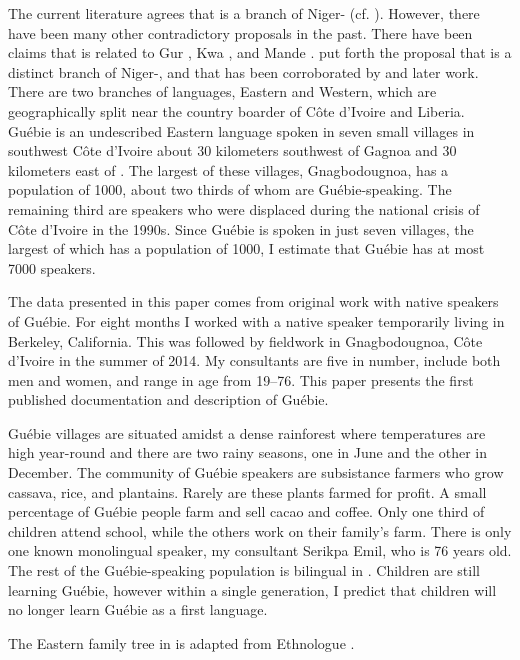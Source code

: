 \documentclass[output=paper,modfonts]{langscibook}
\begin{document}
The current literature agrees that  is a branch of Niger- (cf. \citealt{Marchese2012}). However, there have been many other contradictory proposals in the past. There have been claims that  is related to Gur \citep{Vogler1974}, Kwa \citep{Greenberg1963}, and Mande \citep{Bennett1977}. \cite{Welmers1977} put forth the proposal that  is a distinct branch of Niger-, and that has been corroborated by \cite{Marchese1979} and later work. There are two  branches of  languages, Eastern and Western, which are geographically split near the country boarder of Côte d'Ivoire and Liberia. Guébie is an undescribed Eastern  language spoken in seven small villages in southwest Côte d'Ivoire about 30 kilometers southwest of Gagnoa and 30 kilometers east of . The largest of these villages, Gnagbodougnoa, has a population of 1000, about two thirds of whom are Guébie-speaking. The remaining third are  speakers who were displaced during the national crisis of Côte d'Ivoire in the 1990s. Since Guébie is spoken in just seven villages, the largest of which has a population of 1000, I estimate that Guébie has at most 7000 speakers.

The data presented in this paper comes from original work with native speakers of Guébie. For eight months I worked with a native speaker temporarily living in Berkeley, California. This was followed by fieldwork in Gnagbodougnoa, Côte d'Ivoire in the summer of 2014. My consultants are five in number, include both men and women, and range in age from 19--76. This paper presents the first published documentation and description of Guébie.

Guébie villages are situated amidst a dense rainforest where temperatures are high year-round and there are two rainy seasons, one in June and the other in December. The community of Guébie speakers are subsistance farmers who grow cassava, rice, and plantains. Rarely are these plants farmed for profit. A small percentage of Guébie people farm and sell cacao and coffee. Only one third of children attend school, while the others work on their family's farm. There is only one known monolingual speaker, my consultant Serikpa Emil, who is 76 years old. The rest of the Guébie-speaking population is bilingual in . Children are still learning Guébie, however within a single generation, I predict that children will no longer learn Guébie as a first language.

The Eastern  family tree in  is adapted from Ethnologue \citep{LewisEtAl2013}.
\end{document}
